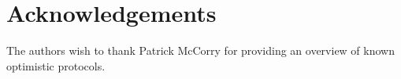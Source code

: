 






% 
\section*{Acknowledgements}
The authors wish to thank Patrick McCorry for providing an overview of known optimistic protocols.
